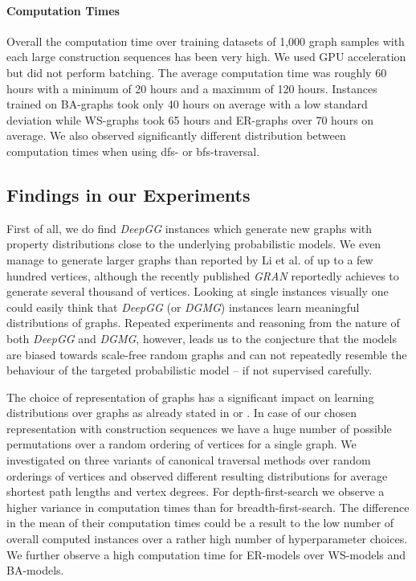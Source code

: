 \documentclass{article}
\begin{document}
\paragraph{Computation Times} Overall the computation time over training datasets of 1,000 graph samples with each large construction sequences has been very high.
We used GPU acceleration but did not perform batching.
The average computation time was roughly 60 hours with a minimum of 20 hours and a maximum of 120 hours.
Instances trained on BA-graphs took only 40 hours on average with a low standard deviation while WS-graphs took 65 hours and ER-graphs over 70 hours on average.
We also observed significantly different distribution between computation times when using dfs- or bfs-traversal.


\subsection{Findings in our Experiments}
First of all, we do find \textit{DeepGG} instances which generate new graphs with property distributions close to the underlying probabilistic models.
We even manage to generate larger graphs than reported by Li et al. of up to a few hundred vertices, although the recently published \textit{GRAN} reportedly achieves to generate several thousand of vertices.
Looking at single instances visually one could easily think that \textit{DeepGG} (or \textit{DGMG}) instances learn meaningful distributions of graphs.
Repeated experiments and reasoning from the nature of both \textit{DeepGG} and \textit{DGMG}, however, leads us to the conjecture that the models are biased towards scale-free random graphs and can not repeatedly resemble the behaviour of the targeted probabilistic model -- if not supervised carefully.

The choice of representation of graphs has a significant impact on learning distributions over graphs as already stated in \cite{you2018graphrnn} or \cite{liao2019efficient}.
In case of our chosen representation with construction sequences we have a huge number of possible permutations over a random ordering of vertices for a single graph.
We investigated on three variants of canonical traversal methods over random orderings of vertices and observed different resulting distributions for average shortest path lengths and vertex degrees.
For depth-first-search we observe a higher variance in computation times than for breadth-first-search.
The difference in the mean of their computation times could be a result to the low number of overall computed instances over a rather high number of hyperparameter choices.
We further observe a high computation time for ER-models over WS-models and BA-models.
\end{document}
